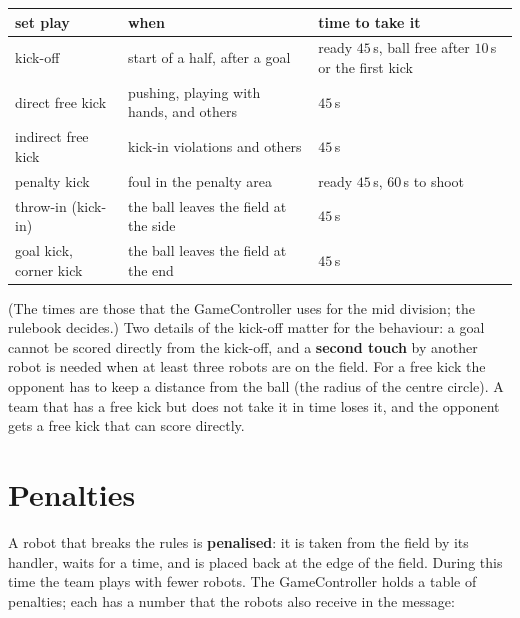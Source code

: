 \begin{center}
\small
\begin{tabular}{p{3.2cm}p{4.6cm}p{5cm}}
\hline
set play & when & time to take it\\
\hline
kick-off & start of a half, after a goal & ready $45$\,s, ball free after $10$\,s or the first kick\\
direct free kick & pushing, playing with hands, and others & $45$\,s\\
indirect free kick & kick-in violations and others & $45$\,s\\
penalty kick & foul in the penalty area & ready $45$\,s, $60$\,s to shoot\\
throw-in (kick-in) & the ball leaves the field at the side & $45$\,s\\
goal kick, corner kick & the ball leaves the field at the end & $45$\,s\\
\hline
\end{tabular}
\end{center}
(The times are those that the GameController uses for the mid division; the rulebook decides.) Two details of the kick-off matter for the behaviour: a goal cannot be scored directly from the kick-off, and a \textbf{second touch} by another robot is needed when at least three robots are on the field. For a free kick the opponent has to keep a distance from the ball (the radius of the centre circle). A team that has a free kick but does not take it in time loses it, and the opponent gets a free kick that can score directly.

\section*{Penalties}
A robot that breaks the rules is \textbf{penalised}: it is taken from the field by its handler, waits for a time, and is placed back at the edge of the field. During this time the team plays with fewer robots. The GameController holds a table of penalties; each has a number that the robots also receive in the message:

